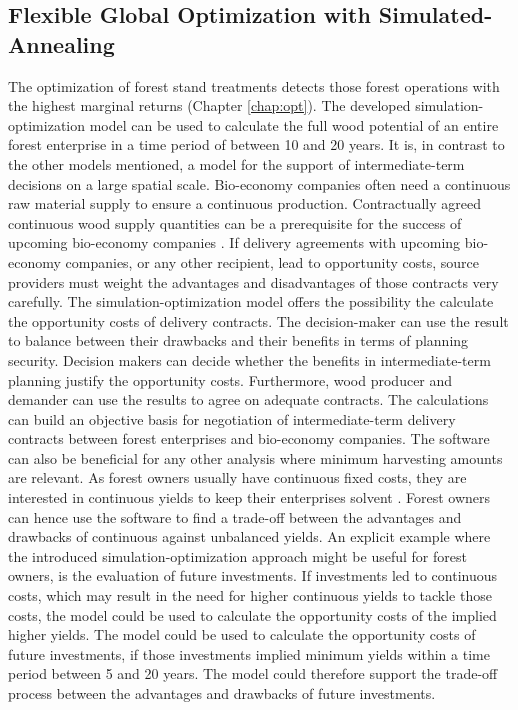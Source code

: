 \subsection{Flexible Global Optimization with Simulated-Annealing}
\label{subsec:discussion:struct:opt}
The optimization of forest stand treatments detects those forest operations with the highest marginal returns (Chapter \ref{chap:opt}). The developed simulation-optimization model can be used to calculate the full wood potential of an entire forest enterprise in a time period of between 10 and 20 years. It is, in contrast to the other models mentioned, a model for the support of intermediate-term decisions on a large spatial scale. Bio-economy companies often need a continuous raw material supply to ensure a continuous production. Contractually agreed continuous wood supply quantities can be a prerequisite for the success of upcoming bio-economy companies \citep[p. 221, 223]{elchichakli_2016}. If delivery agreements with upcoming bio-economy companies, or any other recipient, lead to opportunity costs, source providers must weight the advantages and disadvantages of those contracts very carefully. The simulation-optimization model offers the possibility the calculate the opportunity costs of delivery contracts. The decision-maker can use the result to balance between their drawbacks and their benefits in terms of planning security. Decision makers can decide whether the benefits in intermediate-term planning justify the opportunity costs. Furthermore, wood producer and demander can use the results to agree on adequate contracts. The calculations can build an objective basis for negotiation of intermediate-term delivery contracts between forest enterprises and bio-economy companies. The software can also be beneficial for any other analysis where minimum harvesting amounts are relevant. As forest owners usually have continuous fixed costs, they are interested in continuous yields to keep their enterprises solvent \citep[p. 74]{mohring_2010b}. Forest owners can hence use the software to find a trade-off between the advantages and drawbacks of continuous against unbalanced yields. An explicit example where the introduced simulation-optimization approach might be useful for forest owners, is the evaluation of future investments. If investments led to continuous costs, which may result in the need for higher continuous yields to tackle those costs, the model could be used to calculate the opportunity costs of the implied higher yields. The model could be used to calculate the opportunity costs of future investments, if those investments implied minimum yields within a time period between 5 and 20 years. The model could therefore support the trade-off process between the advantages and drawbacks of future investments.

